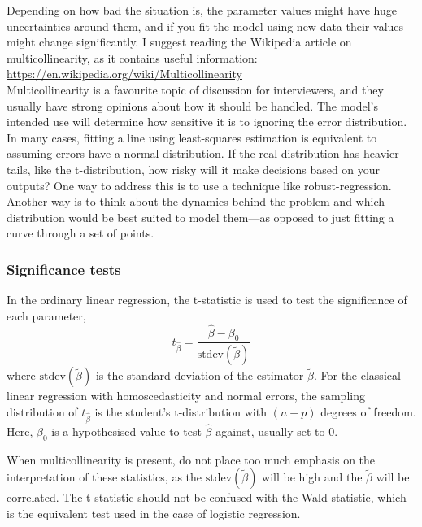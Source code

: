 \documentclass[a4paper]{article}
\begin{document}
\begin{description}
  Depending on how bad the situation is, the parameter values might have huge uncertainties around them, and if you fit the model using new data their values might change significantly.
  I suggest reading the Wikipedia article on multicollinearity, as it contains useful information: \\
  \url{https://en.wikipedia.org/wiki/Multicollinearity} \\
  Multicollinearity is a favourite topic of discussion for interviewers, and they usually have strong opinions about how it should be handled.
  The model's intended use will determine how sensitive it is to ignoring the error distribution.
  In many cases, fitting a line using least-squares estimation is equivalent to assuming errors have a normal distribution.
  If the real distribution has heavier tails, like the t-distribution, how risky will it make decisions based on your outputs?
  One way to address this is to use a technique like robust-regression.
  Another way is to think about the dynamics behind the problem and which distribution would be best suited to model them---as opposed to just fitting a curve through a set of points.
\end{description}

\subsubsection{Significance tests}
In the ordinary linear regression, the t-statistic is used to test the significance of each parameter,
\[
t_{\hat\beta}  =  \frac{\hat\beta - \beta_0}{ \text{stdev}( \tilde\beta) }
\]
where
${\text{stdev}( \tilde\beta)}$
is the standard deviation of the estimator
$\tilde\beta$.
For the classical linear regression with homoscedasticity and normal errors,
the sampling distribution of
$t_{\hat\beta}$
is the student's t-distribution with $(n-p)$ degrees of freedom.
Here, $\beta_0$ is a hypothesised value to test $\hat\beta$ against, usually set to $0$.

When multicollinearity is present, do not place too much emphasis on the interpretation of these statistics, as the  $\text{stdev}( \tilde\beta) $ will be high and the $\tilde\beta$ will be correlated. The t-statistic should not be confused with the Wald statistic, which is the equivalent test used in the case of logistic regression.
\end{document}
